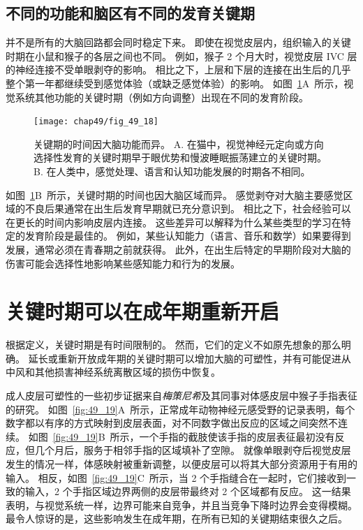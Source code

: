 \subsection{不同的功能和脑区有不同的发育关键期}

并不是所有的大脑回路都会同时稳定下来。
即使在视觉皮层内，组织输入的关键时期在小鼠和猴子的各层之间也不同。
例如，猴子 2 个月大时，视觉皮层 IVC 层的神经连接不受单眼剥夺的影响。
相比之下，上层和下层的连接在出生后的几乎整个第一年都继续受到感觉体验（或缺乏感觉体验）的影响。
如图~\ref{fig:49_18}A~所示，视觉系统其他功能的关键时期（例如方向调整）出现在不同的发育阶段。


\begin{figure}[htbp]
	\centering
	\texttt{[image: chap49/fig\_49\_18]}
	\caption{关键期的时间因大脑功能而异。
		A. 在猫中，视觉神经元定向或方向选择性发育的关键时期早于眼优势和慢波睡眠振荡建立的关键时期。
        B. 在人类中，感觉处理、语言和认知功能发展的时期各不相同。}
	\label{fig:49_18}
\end{figure}


如图~\ref{fig:49_18}B~所示，关键时期的时间也因大脑区域而异。
感觉剥夺对大脑主要感觉区域的不良后果通常在出生后发育早期就已充分意识到。
相比之下，社会经验可以在更长的时间内影响皮层内连接。
这些差异可以解释为什么某些类型的学习在特定的发育阶段是最佳的。
例如，某些认知能力（语言、音乐和数学）如果要得到发展，通常必须在青春期之前就获得。
此外，在出生后特定的早期阶段对大脑的伤害可能会选择性地影响某些感知能力和行为的发展。



\section{关键时期可以在成年期重新开启}

根据定义，关键时期是有时间限制的。
然而，它们的定义不如原先想象的那么明确。
延长或重新开放成年期的关键时期可以增加大脑的可塑性，并有可能促进从中风和其他损害神经系统离散区域的损伤中恢复。

成人皮层可塑性的一些初步证据来自\textit{梅策尼希}及其同事对体感皮层中猴子手指表征的研究。
如图~\ref{fig:49_19}A~所示，正常成年动物神经元感受野的记录表明，每个数字都以有序的方式映射到皮层表面，对不同数字做出反应的区域之间突然不连续。
如图~\ref{fig:49_19}B~所示，一个手指的截肢使该手指的皮层表征最初没有反应，但几个月后，服务于相邻手指的区域填补了空隙。
就像单眼剥夺后视觉皮层发生的情况一样，体感映射被重新调整，以便皮层可以将其大部分资源用于有用的输入。
相反，如图~\ref{fig:49_19}C~所示，当 2 个手指缝合在一起时，它们接收到一致的输入，2 个手指区域边界两侧的皮层带最终对 2 个区域都有反应。
这一结果表明，与视觉系统一样，边界可能来自竞争，并且当竞争下降时边界会变得模糊。
最令人惊讶的是，这些影响发生在成年期，在所有已知的关键期结束很久之后。


